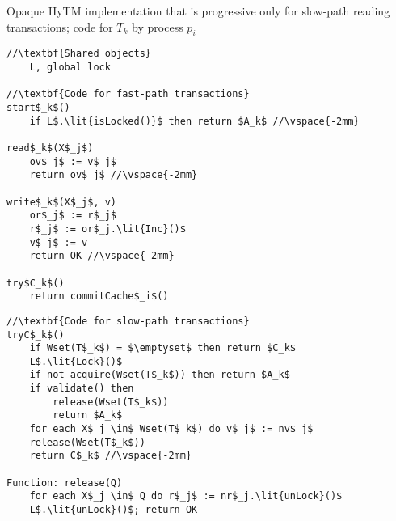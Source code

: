 \begin{algorithm*}[!t]
\caption{Opaque HyTM implementation that is progressive only for slow-path reading transactions; code for $T_k$ by process $p_i$}
\label{alg:inswrite2}
\vspace{-2mm}
\noindent\lstset{style=customc}
\begin{minipage}{0.49\textwidth}
\begin{lstlisting}[frame=none,firstnumber=1,mathescape=true]
//\textbf{Shared objects}
    L, global lock

//\textbf{Code for fast-path transactions}
start$_k$()
    if L$.\lit{isLocked()}$ then return $A_k$ //\vspace{-2mm}

read$_k$(X$_j$)
    ov$_j$ := v$_j$ 
    return ov$_j$ //\vspace{-2mm}

write$_k$(X$_j$, v)
    or$_j$ := r$_j$ 
    r$_j$ := or$_j.\lit{Inc}()$ 
    v$_j$ := v 
    return OK //\vspace{-2mm}

try$C_k$()
    return commitCache$_i$() 
\end{lstlisting}
\end{minipage}
\begin{minipage}{0.49\textwidth}
\begin{lstlisting}[frame=none,firstnumber=last,mathescape=true]
//\textbf{Code for slow-path transactions}
tryC$_k$()
    if Wset(T$_k$) = $\emptyset$ then return $C_k$
    L$.\lit{Lock}()$
    if not acquire(Wset(T$_k$)) then return $A_k$
    if validate() then
        release(Wset(T$_k$))
        return $A_k$
    for each X$_j \in$ Wset(T$_k$) do v$_j$ := nv$_j$
    release(Wset(T$_k$))
    return C$_k$ //\vspace{-2mm}
    
Function: release(Q)
    for each X$_j \in$ Q do r$_j$ := nr$_j.\lit{unLock}()$
    L$.\lit{unLock}()$; return OK
\end{lstlisting}
\end{minipage}
\vspace{-2mm}
\end{algorithm*}
